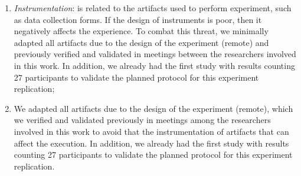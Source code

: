 \begin{enumerate} [label=\roman*.]
    \item \textit{Instrumentation}: is related to the artifacts used to perform experiment, such as data collection forms. 
    If the design of instruments is poor, then it negatively affects the experience.
    To combat this threat, we minimally adapted all artifacts due to the design of the experiment (remote) and previously verified and validated in meetings between the researchers involved in this work.
    In addition, we already had the first study with results counting 27 participants to validate the planned protocol for this experiment replication;
    
    \item We adapted all artifacts due to the design of the experiment (remote), which we verified and validated previously in meetings among the researchers involved in this work to avoid that the instrumentation of artifacts that can affect the execution.
    In addition, we already had the first study with results counting 27 participants to validate the planned protocol for this experiment replication.
\end{enumerate}

